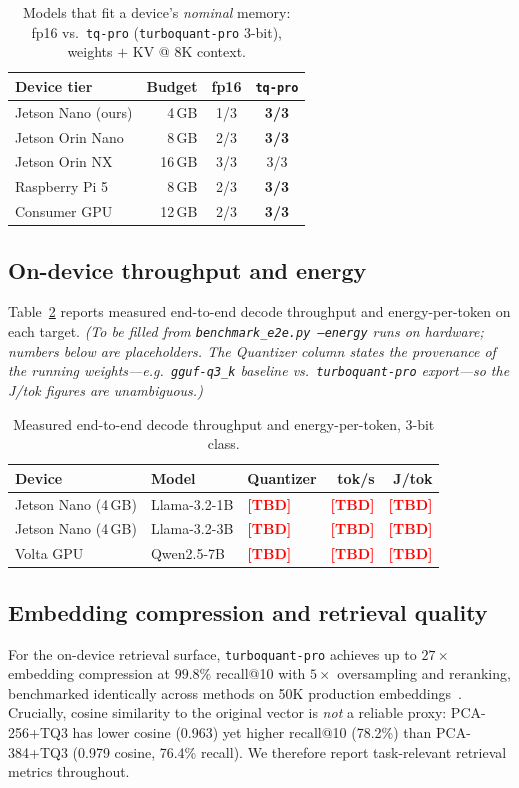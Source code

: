 \documentclass[10pt,conference,compsoc]{IEEEtran}
\newcommand{\tbd}[1][TBD]{\textcolor{red}{\textbf{[#1]}}}
\begin{document}
\begin{table}[t]
\caption{Models that fit a device's \emph{nominal} memory: fp16 vs.\
\texttt{tq-pro} (\texttt{turboquant-pro} 3-bit), weights $+$ KV @ 8K context.}
\label{tab:fit}
\centering
\begin{tabular}{lrcc}
\toprule
Device tier & Budget & fp16 & \texttt{tq-pro} \\
\midrule
Jetson Nano (ours) & 4\,GB & 1/3 & \textbf{3/3} \\
Jetson Orin Nano & 8\,GB  & 2/3 & \textbf{3/3} \\
Jetson Orin NX   & 16\,GB & 3/3 & 3/3 \\
Raspberry Pi 5   & 8\,GB  & 2/3 & \textbf{3/3} \\
Consumer GPU     & 12\,GB & 2/3 & \textbf{3/3} \\
\bottomrule
\end{tabular}
\end{table}

\subsection{On-device throughput and energy}
Table~\ref{tab:device} reports measured end-to-end decode throughput and
energy-per-token on each target. \emph{(To be filled from
\texttt{benchmark\_e2e.py --energy} runs on hardware; numbers below are
placeholders. The Quantizer column states the provenance of the running
weights---e.g.\ \texttt{gguf-q3\_k} baseline vs.\ \texttt{turboquant-pro}
export---so the J/tok figures are unambiguous.)}

\begin{table}[t]
\caption{Measured end-to-end decode throughput and energy-per-token, 3-bit class.}
\label{tab:device}
\centering
\begin{tabular}{lllrr}
\toprule
Device & Model & Quantizer & tok/s & J/tok \\
\midrule
Jetson Nano (4\,GB) & Llama-3.2-1B & \tbd & \tbd & \tbd \\
Jetson Nano (4\,GB) & Llama-3.2-3B & \tbd & \tbd & \tbd \\
Volta GPU           & Qwen2.5-7B   & \tbd & \tbd & \tbd \\
\bottomrule
\end{tabular}
\end{table}

\subsection{Embedding compression and retrieval quality}
For the on-device retrieval surface, \texttt{turboquant-pro} achieves up to
$27\times$ embedding compression at $99.8\%$ recall@10 with $5\times$ oversampling
and reranking, benchmarked identically across methods on 50K production
embeddings~\cite{turboquantpro}. Crucially, cosine similarity to the original vector
is \emph{not} a reliable proxy: PCA-256+TQ3 has lower cosine (0.963) yet higher
recall@10 (78.2\%) than PCA-384+TQ3 (0.979 cosine, 76.4\% recall). We therefore
report task-relevant retrieval metrics throughout.
\end{document}
